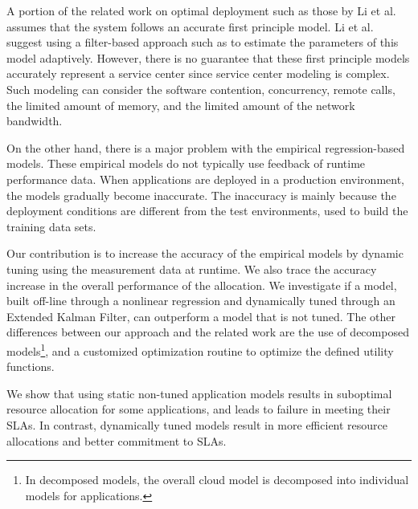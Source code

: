 A portion of the related work on optimal deployment such as those by Li et al.\cite{li_fast_2009,li_performance_2009} assumes that the system follows an accurate first principle model. Li et al. suggest using a filter-based approach such as \cite{zheng-integrated-2011} to estimate the parameters of this model adaptively. 
However, there is no guarantee that these first principle models accurately represent a service center since service center modeling is complex. Such modeling can consider the software contention, concurrency, remote calls, the limited amount of memory, and the limited amount of the network bandwidth.  

On the other hand, there is a major problem with the empirical regression-based models. 
These empirical models do not typically use feedback of runtime performance data. 
When applications are deployed in a production environment, the models gradually become inaccurate. The inaccuracy is mainly because the deployment conditions are different from the test environments, used to build the training data sets.  
 
Our contribution is to increase the accuracy of the empirical models by dynamic tuning using the measurement data at runtime. We also trace the accuracy increase in the overall performance of the allocation. We investigate if a model, built off-line through a nonlinear regression and dynamically tuned through an Extended Kalman Filter, can outperform a model that is not tuned. The other differences between our approach and the related work are the use of 
decomposed models\footnote{In decomposed models, the overall cloud model is decomposed into individual models for applications.}, and a customized optimization routine to optimize the defined utility functions.   


We show that using static non-tuned application models results in suboptimal resource allocation for some applications, and leads to failure in meeting their SLAs. In contrast, dynamically tuned models result in more efficient resource allocations and better commitment to SLAs.%



